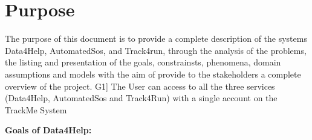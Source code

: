 \section{Purpose}
The purpose of this document is to provide a complete description of the systems Data4Help, AutomatedSos, and Track4run, through the analysis of the problems, the listing and presentation of the goals, constrainsts, phenomena, domain assumptions and models with the aim of provide to the stakeholders a complete overview of the project.
\newline \newline
G1] The User can access to all the three services (Data4Help, AutomatedSos and Track4Run) with a single account on the TrackMe System \newline

\textbf{Goals of Data4Help:}
